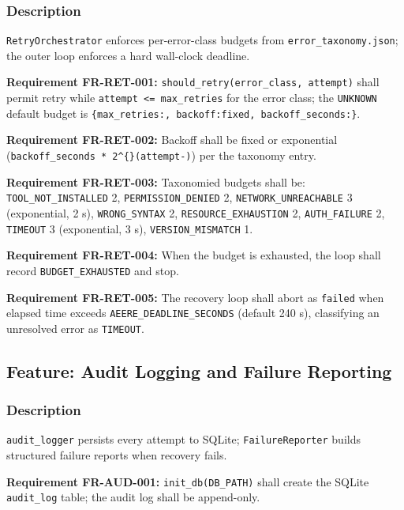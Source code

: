 \documentclass[10pt,journal,onecolumn]{IEEEtran}
\newcommand{\reqid}[1]{\textbf{#1}}
\begin{document}
\subsubsection{Description}

\texttt{RetryOrchestrator} enforces per-error-class budgets from \texttt{error\_taxonomy.json}; the outer loop enforces a hard wall-clock deadline.

\reqid{Requirement FR-RET-001:} \texttt{should\_\allowbreak retry(error\_\allowbreak class, attempt)} shall permit retry while \texttt{attempt <= max\_retries} for the error class; the \texttt{UNKNOWN} default budget is \texttt{\{max\_\allowbreak retries:, backoff:\allowbreak  fixed, backoff\_\allowbreak seconds:\}}.

\reqid{Requirement FR-RET-002:} Backoff shall be fixed or exponential (\texttt{backoff\_\allowbreak seconds * 2\textasciicircum\{\}(attempt-)}) per the taxonomy entry.

\reqid{Requirement FR-RET-003:} Taxonomied budgets shall be: \texttt{TOOL\_NOT\_INSTALLED} 2, \texttt{PERMISSION\_DENIED} 2, \texttt{NETWORK\_UNREACHABLE} 3 (exponential, 2 s), \texttt{WRONG\_SYNTAX} 2, \texttt{RESOURCE\_EXHAUSTION} 2, \texttt{AUTH\_FAILURE} 2, \texttt{TIMEOUT} 3 (exponential, 3 s), \texttt{VERSION\_MISMATCH} 1.

\reqid{Requirement FR-RET-004:} When the budget is exhausted, the loop shall record \texttt{BUDGET\_EXHAUSTED} and stop.

\reqid{Requirement FR-RET-005:} The recovery loop shall abort as \texttt{failed} when elapsed time exceeds \texttt{AEERE\_DEADLINE\_SECONDS} (default 240 s), classifying an unresolved error as \texttt{TIMEOUT}.

\subsection{Feature: Audit Logging and Failure Reporting}

\subsubsection{Description}

\texttt{audit\_logger} persists every attempt to SQLite; \texttt{FailureReporter} builds structured failure reports when recovery fails.

\reqid{Requirement FR-AUD-001:} \texttt{init\_db(DB\_PATH)} shall create the SQLite \texttt{audit\_log} table; the audit log shall be append-only.
\end{document}
